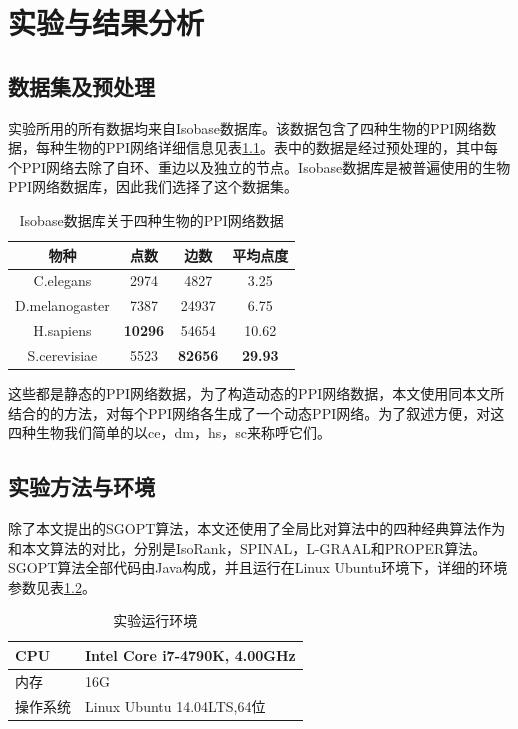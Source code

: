 \chapter{实验与结果分析}

\section{数据集及预处理}
实验所用的所有数据均来自Isobase数据库\cite{park2011isobase}。该数据包含了四种生物的PPI网络数据，每种生物的PPI网络详细信息见表\ref{table:1}。表中的数据是经过预处理的，其中每个PPI网络去除了自环、重边以及独立的节点。Isobase数据库是被普遍使用的生物PPI网络数据库，因此我们选择了这个数据集。


\begin{table}[htbp]
    \centering
    \caption{Isobase数据库关于四种生物的PPI网络数据}
    \label{table:1}
    \begin{tabular}{cccc}
         \hline 物种&点数&边数&平均点度\\
         \hline C.elegans&2974&4827&3.25\\
         D.melanogaster&7387&24937&6.75\\
         H.sapiens&\bf{10296}&54654&10.62\\
         S.cerevisiae&5523&\bf{82656}&\bf{29.93}\\
         \hline
    \end{tabular}
\end{table}

这些都是静态的PPI网络数据，为了构造动态的PPI网络数据，本文使用\cite{zhang2016method}同本文所结合的的方法，对每个PPI网络各生成了一个动态PPI网络。为了叙述方便，对这四种生物我们简单的以ce，dm，hs，sc来称呼它们。

\section{实验方法与环境}
除了本文提出的SGOPT算法，本文还使用了全局比对算法中的四种经典算法作为和本文算法的对比，分别是IsoRank\cite{singh2008global}，SPINAL\cite{aladaug2013spinal}，L-GRAAL\cite{malod2015graal}和PROPER\cite{kazemi2016proper}算法。SGOPT算法全部代码由Java构成，并且运行在Linux Ubuntu环境下，详细的环境参数见表\ref{table:2}。

\begin{table}[htbp]
    \centering
    \caption{实验运行环境}
    \label{table:2}
    \begin{tabular}{l|l}
         \hline 
         CPU&Intel Core i7-4790K, 4.00GHz\\
         \hline
         内存&16G\\
         \hline
         操作系统&Linux Ubuntu 14.04LTS,64位\\
         \hline
    \end{tabular}
\end{table}

